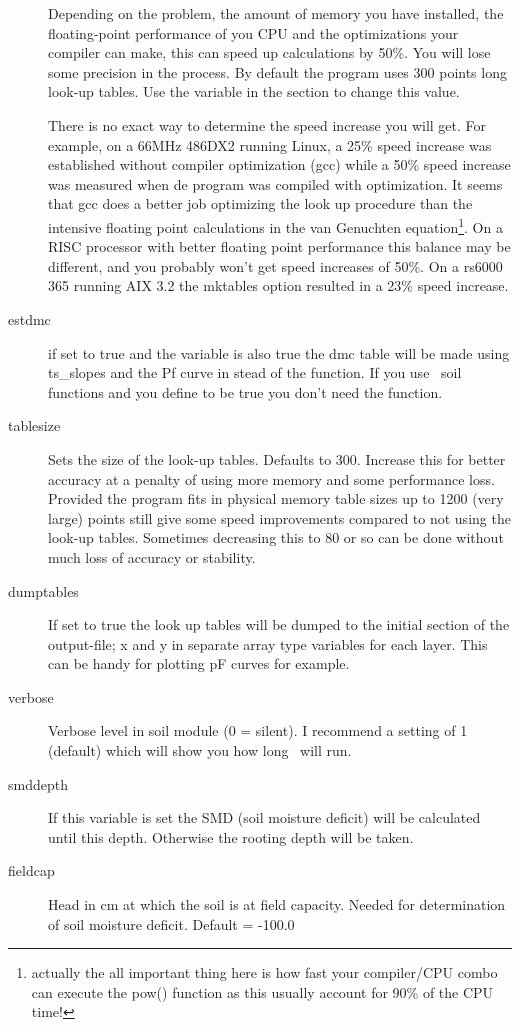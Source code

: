 \begin{description}
Depending on the problem, the amount of memory you have installed, the
floating-point performance of you CPU and the optimizations your
compiler can make, this can speed up calculations by 50\%. You will
lose some precision in the process. By default the program uses 300
points long look-up tables. Use the  variable in the
 section to change this value.

There is no exact way to determine the speed increase you will
get. For example, on a 66MHz 486DX2 running Linux, a 25\% speed
increase was established without compiler optimization (gcc) while a
50\% speed increase was measured when de program was compiled with
optimization. It seems that gcc does a better job optimizing the look
up procedure than the intensive floating point calculations in the van
Genuchten equation\footnote{actually the all important thing here is
how fast your compiler/CPU combo can execute the pow() function
as this usually account for 90\% of the CPU time!}. 
On a RISC processor with better floating point
performance this balance may be different, and you probably won't get
speed increases of 50\%. On a rs6000 365 running AIX 3.2 the mktables
option resulted in a 23\% speed increase.

\item[estdmc]
if set to true and the  variable is also true the dmc
table will be made using ts\_slopes and the Pf curve in stead of the
 function. If you use \slang\ soil functions and you define
 to be true you don't need the  function.


\item[tablesize]
Sets the size of the look-up tables. Defaults to 300. Increase this
for better accuracy at a penalty of using more memory and some
performance loss. Provided the program fits in physical memory table
sizes up to 1200 (very large) points still give some speed
improvements compared to not using the look-up tables.  Sometimes
decreasing this to 80 or so can be done without much loss of accuracy
or stability.

\item[dumptables]
If set to true the look up tables will be dumped to the initial
section of the output-file; x and y in separate array type  variables for each
layer. This can be handy for plotting pF curves for example.

\item[verbose]
Verbose level in soil module (0 = silent). I recommend a setting
of 1 (default) which will show you how long \vamps\ will run.

\item[smddepth]
If this variable is set the SMD (soil moisture deficit) will
be calculated until this depth. Otherwise the rooting depth
will be taken.
\item[fieldcap]
Head in cm at which the soil is at field capacity. Needed for
determination of soil moisture deficit. Default = -100.0

\end{description}

